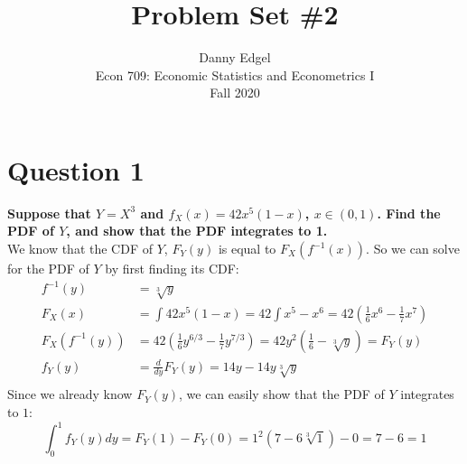 \documentclass{article}
\begin{document}
\title{	Problem Set \#2 }
\author{ 	Danny Edgel 										\\ 
			Econ 709: Economic Statistics and Econometrics I	\\
			Fall 2020											\\
		}
\maketitle\thispagestyle{empty}


\section*{Question 1}
\textbf{Suppose that $Y=X^3$ and $f_X(x)=42x^5(1-x)$, $x\in(0,1)$. Find the PDF of $Y$, and show that the PDF integrates to 1.}
\bigskip \\
We know that the CDF of $Y$, $F_Y(y)$ is equal to $F_X(f^{-1}(x))$. So we can solve for the PDF of $Y$ by first finding its CDF:
\begin{align*}
	f^{-1}(y)		&= \sqrt[3]{y}																			\\
	F_X(x)			&=\int42x^5(1-x)=42\int x^5-x^6=42(\frac{1}{6}x^6-\frac{1}{7}x^7)						\\
	F_X(f^{-1}(y)) 	&= 42(\frac{1}{6}y^{6/3}-\frac{1}{7}y^{7/3})=42y^2(\frac{1}{6}-\sqrt[3]{y}) = F_Y(y)	\\
	f_Y(y)			&= \frac{d}{dy} F_Y(y) = 14y-14y\sqrt[3]{y}												\\
\end{align*}
Since we already know $F_Y(y)$, we can easily show that the PDF of $Y$ integrates to $1$:
\[
	\int_0^1 f_Y(y)dy = F_Y(1)-F_Y(0) = 1^2(7-6\sqrt[3]{1}) - 0 = 7-6 = 1
\]

\end{document}

